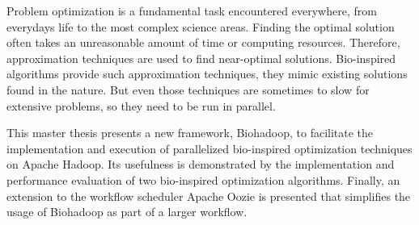 Problem optimization is a fundamental task encountered everywhere, from everydays life to the most complex science areas. Finding the optimal solution often takes an unreasonable amount of time or computing resources. Therefore, approximation techniques are used to find near-optimal solutions. Bio-inspired algorithms provide such approximation techniques, they mimic existing solutions found in the nature. But even those techniques are sometimes to slow for extensive problems, so they need to be run in parallel.

This master thesis presents a new framework, Biohadoop, to facilitate the implementation and execution of parallelized bio-inspired optimization techniques on Apache Hadoop. Its usefulness is demonstrated by the implementation and performance evaluation of two bio-inspired optimization algorithms. Finally, an extension to the workflow scheduler Apache Oozie is presented that simplifies the usage of Biohadoop as part of a larger workflow.

